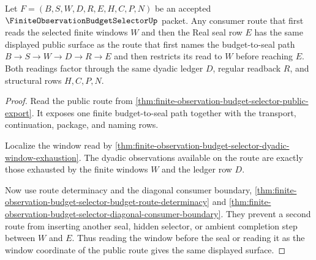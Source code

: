 \begin{theorem}
\label{thm:finite-observation-budget-selector-window-seal-commutation}
Let $F=(B,S,W,D,R,E,H,C,P,N)$ be an accepted $\FiniteObservationBudgetSelectorUp$ packet. Any consumer route that first reads the selected finite windows $W$ and then the Real seal row $E$ has the same displayed public surface as the route that first names the budget-to-seal path $B \to S \to W \to D \to R \to E$ and then restricts its read to $W$ before reaching $E$. Both readings factor through the same dyadic ledger $D$, regular readback $R$, and structural rows $H,C,P,N$.
\end{theorem}
\begin{proof}
Read the public route from \autoref{thm:finite-observation-budget-selector-public-export}. It exposes one finite budget-to-seal path together with the transport, continuation, package, and naming rows.

Localize the window read by \autoref{thm:finite-observation-budget-selector-dyadic-window-exhaustion}. The dyadic observations available on the route are exactly those exhausted by the finite windows $W$ and the ledger row $D$.

Now use route determinacy and the diagonal consumer boundary, \autoref{thm:finite-observation-budget-selector-budget-route-determinacy} and \autoref{thm:finite-observation-budget-selector-diagonal-consumer-boundary}. They prevent a second route from inserting another seal, hidden selector, or ambient completion step between $W$ and $E$. Thus reading the window before the seal or reading it as the window coordinate of the public route gives the same displayed surface.
\end{proof}

